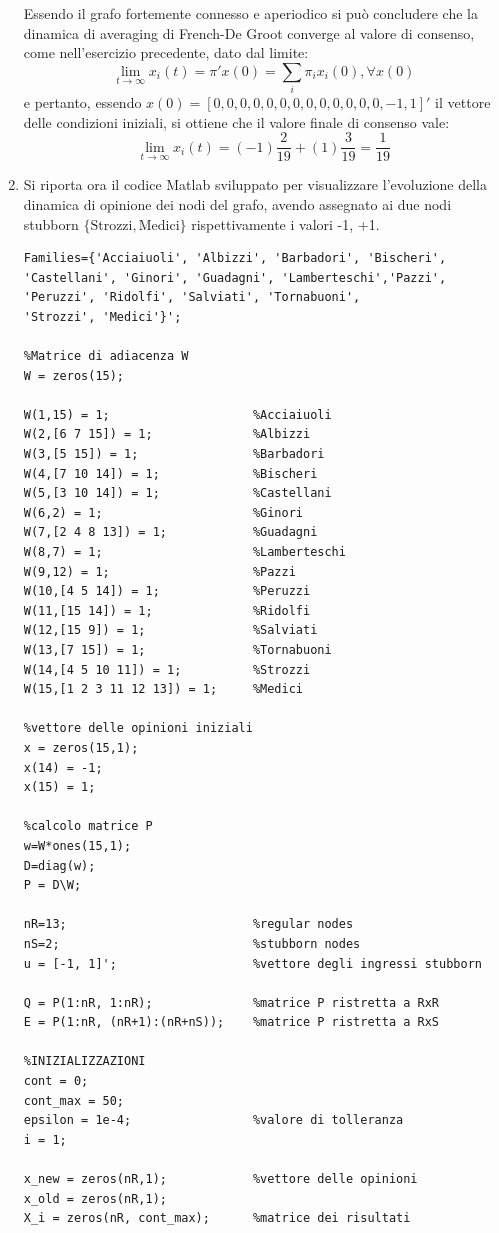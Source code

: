 \documentclass[13pt,largemargins]{homework}
\begin{document}
\begin{enumerate}[label=(\alph*)]
	Essendo il grafo fortemente connesso e aperiodico si può concludere che la dinamica di averaging di French-De Groot converge al valore di consenso, come nell'esercizio precedente, dato dal limite: 
\[\lim_{t \to \infty}x_i(t)=\pi ' x(0)= \sum_i 	\pi_i x_i(0), \forall x(0)\] e pertanto, essendo $x(0)=[0,0,0,0,0,0,0,0,0,0,0,0,0, -1, 1]'$ il vettore delle condizioni iniziali, si ottiene che il valore finale di consenso vale: 
\[\lim_{t \to \infty}x_i(t)= (-1)\frac{2}{19}+(1)\frac{3}{19}=\frac{1}{19}\]

\item %
Si riporta ora il codice Matlab sviluppato per visualizzare l'evoluzione della dinamica di opinione dei nodi del grafo, avendo assegnato ai due nodi stubborn \(\{\text{Strozzi}, \text{Medici}\}\)  rispettivamente i valori -1, +1. 


\begin{lstlisting}
Families={'Acciaiuoli', 'Albizzi', 'Barbadori', 'Bischeri',
'Castellani', 'Ginori', 'Guadagni', 'Lamberteschi','Pazzi',
'Peruzzi', 'Ridolfi', 'Salviati', 'Tornabuoni',
'Strozzi', 'Medici'}'; 

%Matrice di adiacenza W
W = zeros(15); 

W(1,15) = 1; 					%Acciaiuoli
W(2,[6 7 15]) = 1; 				%Albizzi
W(3,[5 15]) = 1; 				%Barbadori
W(4,[7 10 14]) = 1; 			%Bischeri
W(5,[3 10 14]) = 1; 			%Castellani	
W(6,2) = 1; 					%Ginori
W(7,[2 4 8 13]) = 1; 			%Guadagni
W(8,7) = 1; 					%Lamberteschi
W(9,12) = 1; 					%Pazzi
W(10,[4 5 14]) = 1; 			%Peruzzi
W(11,[15 14]) = 1; 				%Ridolfi
W(12,[15 9]) = 1; 				%Salviati
W(13,[7 15]) = 1;        		%Tornabuoni
W(14,[4 5 10 11]) = 1;  		%Strozzi
W(15,[1 2 3 11 12 13]) = 1;     %Medici
		
%vettore delle opinioni iniziali
x = zeros(15,1); 
x(14) = -1; 
x(15) = 1; 

%calcolo matrice P
w=W*ones(15,1); 
D=diag(w); 
P = D\W; 

nR=13;            				%regular nodes
nS=2;             				%stubborn nodes
u = [-1, 1]';     				%vettore degli ingressi stubborn

Q = P(1:nR, 1:nR);   			%matrice P ristretta a RxR
E = P(1:nR, (nR+1):(nR+nS)); 	%matrice P ristretta a RxS

%INIZIALIZZAZIONI
cont = 0; 
cont_max = 50; 
epsilon = 1e-4; 				%valore di tolleranza
i = 1; 

x_new = zeros(nR,1); 			%vettore delle opinioni 
x_old = zeros(nR,1); 
X_i = zeros(nR, cont_max);      %matrice dei risultati



\end{lstlisting}
\end{enumerate}
\end{document}
